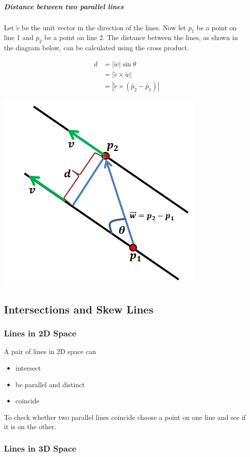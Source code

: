 \documentclass[a4paper,twoside]{article}
\begin{document}
			\subparagraph{Distance between two parallel lines} Let $\utilde{v}$ be the unit vector in the direction of the lines. Now let $p_1$ be a point on line 1 and $p_2$ be a point on line 2. The distance between the lines, as shown in the diagram below, can be calculated using the cross product.\\
			\begin{minipage}{0.5\linewidth}
				\begin{align*}
					d&=|\utilde{w}|\sin\theta \\
					&=\left|\utilde{v}\times\utilde{w}\right|\\
					&=\left|\utilde{v}\times\left(\utilde{p_2}-\utilde{p_1}\right)\right|
				\end{align*}
			\end{minipage}
			\hfill
			\begin{minipage}{0.5\linewidth}
				\includegraphics[width=0.5\linewidth]{vectorlinesdist.png}
			\end{minipage}
		\subsection{Intersections and Skew Lines}
			\subsubsection{Lines in 2D Space} A pair of lines in 2D space can
			\begin{itemize}
				\item intersect
				\item be parallel and distinct
				\item coincide
			\end{itemize}
			To check whether two parallel lines coincide choose a point on one line and see if it is on the other.
			
			\subsubsection{Lines in 3D Space}
\end{document}

